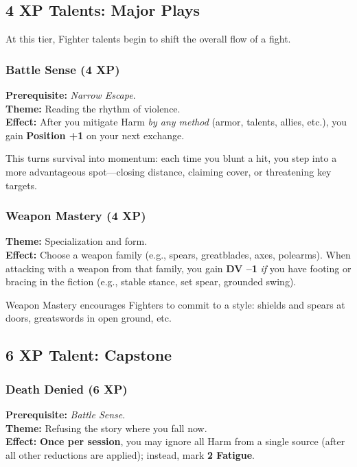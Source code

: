 \documentclass[11pt]{book}
\begin{document}
\subsection{4 XP Talents: Major Plays}

At this tier, Fighter talents begin to shift the overall flow of a fight.

\subsubsection{Battle Sense (4 XP)}
\textbf{Prerequisite:} \emph{Narrow Escape}.\\
\textbf{Theme:} Reading the rhythm of violence.\\
\textbf{Effect:} After you mitigate Harm \emph{by any method}
(armor, talents, allies, etc.), you gain \textbf{Position +1}
on your next exchange.

This turns survival into momentum: each time you blunt a hit,
you step into a more advantageous spot---closing distance, claiming cover,
or threatening key targets.

\subsubsection{Weapon Mastery (4 XP)}
\textbf{Theme:} Specialization and form.\\
\textbf{Effect:} Choose a weapon family (e.g., spears, greatblades, axes, polearms).
When attacking with a weapon from that family, you gain \textbf{DV --1}
\emph{if} you have footing or bracing in the fiction
(e.g., stable stance, set spear, grounded swing).

Weapon Mastery encourages Fighters to commit to a style:
shields and spears at doors, greatswords in open ground, etc.

\subsection{6 XP Talent: Capstone}

\subsubsection{Death Denied (6 XP)}
\textbf{Prerequisite:} \emph{Battle Sense}.\\
\textbf{Theme:} Refusing the story where you fall now.\\
\textbf{Effect:} \textbf{Once per session}, you may ignore all Harm from a single source
(after all other reductions are applied); instead, mark \textbf{2 Fatigue}.
\end{document}
